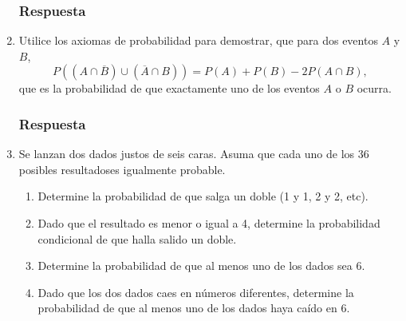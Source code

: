 \documentclass[dvipsnames,a4paper]{book}
\begin{document}
\begin{enumerate}[{Ej1. }]
\subsubsection{Respuesta}





\item Utilice los axiomas de probabilidad para demostrar, que para dos eventos
    \(A\) y  \(B\),
    \[P\left(\left(A\cap \overline{B}\right)\cup\left(\overline{A}\cap B\right)
    \right)=P\left(A\right)+P\left(B\right)-2P\left(A\cap B\right),\]
    que es la probabilidad de que exactamente uno de los eventos \(A\) o \(B\)
    ocurra.
\subsubsection{Respuesta}











\item Se lanzan dos dados justos de seis caras. Asuma que cada uno  de los
    {\color{NavyBlue} 36 posibles resultadoses igualmente probable}.

    \begin{enumerate}[{a) }]
        \item Determine la probabilidad de que salga un doble {\color{Magenta}
            (1 y 1, 2 y 2, etc)}.
        \item Dado que el resultado es menor o igual a 4, {\color{ForestGreen}
            determine la probabilidad condicional de que halla salido un
            doble}.
        \item Determine la probabilidad de que al menos uno de los dados sea 6.

        \item Dado que los dos dados caes en números diferentes, {\color{Melon}
            determine la probabilidad de que al menos uno de los dados haya
            caído en 6}.
    \end{enumerate}

\end{enumerate}
\end{document}
